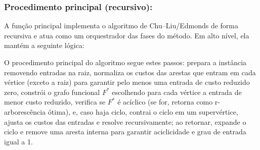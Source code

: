 \subsubsection{Procedimento principal (recursivo):}
A função principal implementa o algoritmo de Chu–Liu/Edmonds de forma recursiva e atua como um orquestrador das fases do método. Em alto nível, ela mantém a seguinte lógica:

% 

% 

% 

% 

% 


O procedimento principal do algoritmo segue estes passos: prepara a instância removendo entradas na raiz, normaliza os custos das arestas que entram em cada vértice (exceto a raiz) para garantir pelo menos uma entrada de custo reduzido zero, constrói o grafo funcional $F^*$ escolhendo para cada vértice a entrada de menor custo reduzido, verifica se $F^*$ é acíclico (se for, retorna como r-arborescência ótima), e, caso haja ciclo, contrai o ciclo em um supervértice, ajusta os custos das entradas e resolve recursivamente; ao retornar, expande o ciclo e remove uma aresta interna para garantir aciclicidade e grau de entrada igual a 1.


